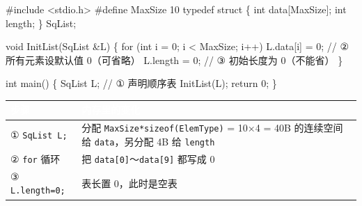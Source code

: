 \documentclass[10.5pt,a4paper,oneside]{article}
\newenvironment{Shaded}{}{}
\newcommand{\CommentTok}[1]{\textcolor[rgb]{0.18,0.55,0.23}{#1}}
\newcommand{\ControlFlowTok}[1]{\textcolor[rgb]{0.12,0.31,0.71}{#1}}
\newcommand{\DataTypeTok}[1]{\textcolor[rgb]{0.12,0.31,0.71}{#1}}
\newcommand{\DecValTok}[1]{\textcolor[rgb]{0.77,0.35,0.07}{#1}}
\newcommand{\ImportTok}[1]{\textcolor[rgb]{0.44,0.19,0.63}{#1}}
\newcommand{\KeywordTok}[1]{\textcolor[rgb]{0.12,0.31,0.71}{#1}}
\newcommand{\NormalTok}[1]{#1}
\newcommand{\OperatorTok}[1]{\textcolor[rgb]{0.20,0.20,0.20}{#1}}
\newcommand{\PreprocessorTok}[1]{\textcolor[rgb]{0.44,0.19,0.63}{#1}}
\begin{document}
\begin{Shaded}
\begin{Highlighting}[]
\PreprocessorTok{\#include }\ImportTok{\textless{}stdio.h\textgreater{}}
\PreprocessorTok{\#define MaxSize }\DecValTok{10}
\KeywordTok{typedef} \KeywordTok{struct} \OperatorTok{\{}
    \DataTypeTok{int}\NormalTok{ data}\OperatorTok{[}\NormalTok{MaxSize}\OperatorTok{];}
    \DataTypeTok{int}\NormalTok{ length}\OperatorTok{;}
\OperatorTok{\}}\NormalTok{ SqList}\OperatorTok{;}

\DataTypeTok{void}\NormalTok{ InitList}\OperatorTok{(}\NormalTok{SqList }\OperatorTok{\&}\NormalTok{L}\OperatorTok{)} \OperatorTok{\{}
    \ControlFlowTok{for} \OperatorTok{(}\DataTypeTok{int}\NormalTok{ i }\OperatorTok{=} \DecValTok{0}\OperatorTok{;}\NormalTok{ i }\OperatorTok{\textless{}}\NormalTok{ MaxSize}\OperatorTok{;}\NormalTok{ i}\OperatorTok{++)}
\NormalTok{        L}\OperatorTok{.}\NormalTok{data}\OperatorTok{[}\NormalTok{i}\OperatorTok{]} \OperatorTok{=} \DecValTok{0}\OperatorTok{;}          \CommentTok{// ② 所有元素设默认值 0（可省略）}
\NormalTok{    L}\OperatorTok{.}\NormalTok{length }\OperatorTok{=} \DecValTok{0}\OperatorTok{;}               \CommentTok{// ③ 初始长度为 0（不能省）}
\OperatorTok{\}}

\DataTypeTok{int}\NormalTok{ main}\OperatorTok{()} \OperatorTok{\{}
\NormalTok{    SqList L}\OperatorTok{;}                   \CommentTok{// ① 声明顺序表}
\NormalTok{    InitList}\OperatorTok{(}\NormalTok{L}\OperatorTok{);}
    \ControlFlowTok{return} \DecValTok{0}\OperatorTok{;}
\OperatorTok{\}}
\end{Highlighting}
\end{Shaded}

{
\begin{xltabular}{\linewidth}{>{\hsize\raggedright\arraybackslash}X>{\hsize\raggedright\arraybackslash}X}
\textcolor{white}{\bfseries 步骤} & \textcolor{white}{\bfseries 内存里的变化} \\
\endfirsthead
① \texttt{SqList\ L;} & 分配 \texttt{MaxSize*sizeof(ElemType)} = 10×4 = 40B 的连续空间给 \texttt{data}，另分配 4B 给 \texttt{length} \\ \hline
② \texttt{for} 循环 & 把 \texttt{data{[}0{]}}～\texttt{data{[}9{]}} 都写成 0 \\ \hline
③ \texttt{L.length=0;} & 表长置 0，此时是空表 \\ \hline
\end{xltabular}\par\vspace{4pt}}
\end{document}
